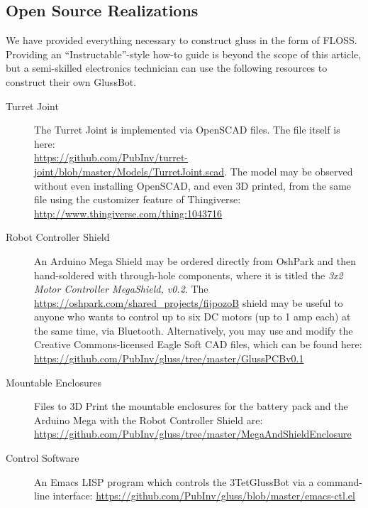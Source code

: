 \documentclass[11pt]{article}
\begin{document}
\subsection{Open Source Realizations}

We have provided everything necessary to construct gluss in the form of FLOSS. Providing an ``Instructable''-style
how-to guide is beyond the scope of this article, but a semi-skilled electronics technician can use the
following resources to construct their own GlussBot.

\begin{description}
  
\item [Turret Joint]
  The Turret Joint is implemented via OpenSCAD files. The file itself is here:\\
  \url{https://github.com/PubInv/turret-joint/blob/master/Models/TurretJoint.scad}.
       The model may be observed without even installing OpenSCAD, and even 3D printed,
       from the same file using the customizer feature of Thingiverse:\\
       \url{http://www.thingiverse.com/thing:1043716}
  
\item [Robot Controller Shield]
  An Arduino Mega Shield may be ordered directly from OshPark and then hand-soldered with through-hole components,
  where it is titled the \emph{3x2 Motor Controller MegaShield, v0.2}.
  The \url{https://oshpark.com/shared_projects/fijpozoB} shield
  may be useful to anyone who wants to control up to six DC motors (up to 1 amp each) at the same time, via Bluetooth.
  Alternatively, you may use and modify the Creative Commons-licensed Eagle Soft CAD files, which can be found here:\\
  \url{https://github.com/PubInv/gluss/tree/master/GlussPCBv0.1}

\item [Mountable Enclosures]
  Files to 3D Print the mountable enclosures for the battery pack and the Arduino Mega with the Robot Controller Shield are:\\
  \url{https://github.com/PubInv/gluss/tree/master/MegaAndShieldEnclosure}

\item [Control Software]
An Emacs LISP program which controls the 3TetGlussBot via a command-line interface:
\url{https://github.com/PubInv/gluss/blob/master/emacs-ctl.el}


\end{description}
\end{document}
